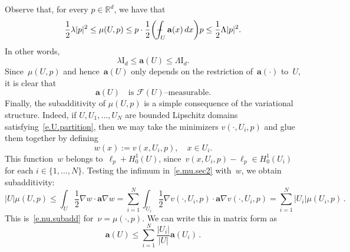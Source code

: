 \documentclass[11pt]{article} %
\numberwithin{equation}{section}
\theoremstyle{definition}
\newcommand*{\Id}{\ensuremath{\mathrm{I}_d}}
\newcommand*{\Rd}{\ensuremath{\mathbb{R}^d}}
\renewcommand{\a}{\mathbf{a}}
\newcommand{\F}{\mathcal{F}}
\def\Xint#1{\mathchoice
{\XXint\displaystyle\textstyle{#1}}%
{\XXint\textstyle\scriptstyle{#1}}%
{\XXint\scriptstyle\scriptscriptstyle{#1}}%
{\XXint\scriptscriptstyle\scriptscriptstyle{#1}}%
\!\int}
\def\XXint#1#2#3{{\setbox0=\hbox{$#1{#2#3}{\int}$}
\vcenter{\hbox{$#2#3$}}\kern-.5\wd0}}
\def\fint{\Xint-}
\begin{document}
\smallskip

Observe that, for every $p\in\Rd$, we have that 
\begin{equation}
\label{e.mu.bounds.sec2}
\frac12 \lambda |p|^2 \leq \mu(U,p) \leq p\cdot \frac12\biggl(\fint_U \a(x)\,dx\biggr) p \leq \frac12 {\Lambda}|p|^2.
\end{equation}
In other words, 
\begin{equation*}
\lambda  \Id \leq \a(U) \leq \Lambda  \Id. 
\end{equation*}
Since~$\mu(U,p)$ and hence~$\a(U)$ only depends on the restriction of~$\a(\cdot)$ to~$U$, it is clear that
\begin{equation}
\label{e.mu.local.sec2}
\a(U) \quad \mbox{is $\F(U)$--measurable.}
\end{equation}
Finally, the subadditivity of $\mu(U,p)$ is a simple consequence of the variational structure.
Indeed, if $U, U_1,\ldots,U_N$ are bounded Lipschitz domains satisfying~\eqref{e.U.partition}, then we may take the minimizers $v(\cdot,U_i,p)$ and glue them together by defining
\begin{equation*}
w(x) := v(x,U_i,p), \quad x\in U_i. 
\end{equation*}
This function~$w$ belongs to~$\ell_p + H^1_0(U)$, since~$v(x,U_i,p) - \ell_p\in H^1_0(U_i)$ for each $i\in\{1,\ldots,N\}$. 
Testing the infimum in~\eqref{e.mu.sec2} with~$w$, we obtain subadditivity:
\begin{equation}
\label{e.subadd.sec2}
|U| \mu(U,p) 
\leq 
\int_{U} \frac12\nabla w \cdot \a\nabla w 
=
\sum_{i=1}^N 
\int_{U_i} \frac12\nabla v(\cdot,U_i,p)  \cdot \a\nabla v(\cdot,U_i,p) 
=
\sum_{i=1}^N |U_i| \mu(U_i,p)\,.
\end{equation}
This is~\eqref{e.nu.subadd} for~$\nu = \mu(\cdot,p)$. 
We can write this in matrix form as
\begin{equation*}
\a(U) \leq \sum_{i=1}^N \frac{|U_i|}{|U|} \a(U_i)\,.
\end{equation*}


\smallskip
\end{document}
